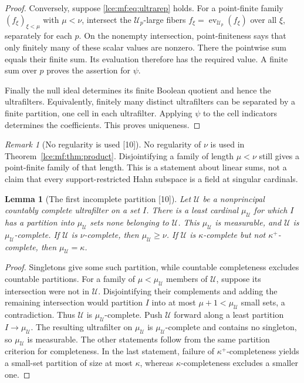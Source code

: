 \documentclass[11pt,letterpaper]{article}
\numberwithin{equation}{section}
\newtheorem{lemma}[theorem]{Lemma}
\theoremstyle{definition}
\theoremstyle{remark}
\newtheorem{remark}[theorem]{Remark}
\newcommand{\thref}[1]{Theorem~\ref{#1}}
\newcommand{\src}[1]{\textup{\textsf{\small[#1]}}}%
\newcommand{\ev}{\operatorname{ev}}
\begin{document}
\begin{proof}
Conversely, suppose \eqref{lce:mf:eq:ultrarep} holds. For a point-finite
family $(f_\xi)_{\xi<\mu}$ with $\mu<\nu$, intersect the $\mathcal
U_p$-large fibers $f_\xi=\ev_{\mathcal U_p}(f_\xi)$ over all $\xi$,
separately for each $p$. On the nonempty intersection, point-finiteness
says that only finitely many of these scalar values are nonzero. There the
pointwise sum equals their finite sum. Its evaluation therefore has the
required value. A finite sum over $p$ proves the assertion for $\psi$.

Finally the null ideal determines its finite Boolean quotient and hence the
ultrafilters. Equivalently, finitely many distinct ultrafilters can be
separated by a finite partition, one cell in each ultrafilter. Applying
$\psi$ to the cell indicators determines the coefficients. This proves
uniqueness.
\end{proof}

\begin{remark}[No regularity is used \src{10}]\label{lce:mf:rem:nu}
No regularity of $\nu$ is used in \thref{lce:mf:thm:product}.
Disjointifying a family of length $\mu<\nu$ still gives a point-finite
family of that length. This is a statement about linear sums, not a claim
that every support-restricted Hahn subspace is a field at singular
cardinals.
\end{remark}

\begin{lemma}[The first incomplete partition \src{10}]\label{lce:mf:lem:partition}
Let $\mathcal U$ be a nonprincipal countably complete ultrafilter on a set
$I$. There is a least cardinal $\mu_{\mathcal U}$ for which $I$ has a
partition into $\mu_{\mathcal U}$ sets none belonging to $\mathcal U$. This
$\mu_{\mathcal U}$ is measurable, and $\mathcal U$ is
$\mu_{\mathcal U}$-complete. If $\mathcal U$ is $\nu$-complete, then
$\mu_{\mathcal U}\ge\nu$. If $\mathcal U$ is $\kappa$-complete but not
$\kappa^+$-complete, then $\mu_{\mathcal U}=\kappa$.
\end{lemma}
\begin{proof}
Singletons give some such partition, while countable completeness excludes
countable partitions. For a family of $\mu<\mu_{\mathcal U}$ members of
$\mathcal U$, suppose its intersection were not in $\mathcal U$.
Disjointifying their complements and adding the remaining intersection
would partition $I$ into at most $\mu+1<\mu_{\mathcal U}$ small sets, a
contradiction. Thus $\mathcal U$ is $\mu_{\mathcal U}$-complete. Push
$\mathcal U$ forward along a least partition $I\to\mu_{\mathcal U}$. The
resulting ultrafilter on $\mu_{\mathcal U}$ is $\mu_{\mathcal U}$-complete
and contains no singleton, so $\mu_{\mathcal U}$ is measurable. The other
statements follow from the same partition criterion for completeness. In
the last statement, failure of $\kappa^+$-completeness yields a small-set
partition of size at most $\kappa$, whereas $\kappa$-completeness excludes
a smaller one.
\end{proof}
\end{document}
